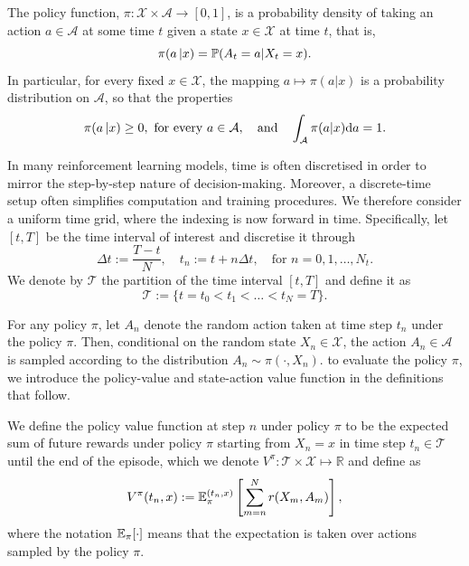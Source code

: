 \begin{definition}
\label{def: Stochastic policy function}
    The policy function, $\pi: \mathcal{X} \times \mathcal{A} \rightarrow [0,1]$, is a probability density of taking an action $a \in \mathcal{A}$ at some time $t$ given a state $x \in \mathcal{X}$ at time $t$, that is,
    \begin{equation*}
        \pi(a \, | x) = \mathbb{P}(A_t = a | X_t = x).
    \end{equation*}
    In particular, for every fixed $x \in \mathcal{X}$, the mapping $a \mapsto \pi(a | x) $ is a probability distribution on $\mathcal{A}$, so that the properties 
    \begin{equation*}
        \pi(a \, | x) \geq 0, \text{ for every } a \in \mathcal{A}, \quad \text{and} \quad \int_{\mathcal{A}} \pi(a | x) \mathrm{d} a = 1.
    \end{equation*}
\end{definition}

In many reinforcement learning models, time is often discretised in order to mirror the step-by-step nature of decision-making. Moreover, a discrete-time setup often simplifies computation and training procedures. We therefore consider a uniform time grid, where the indexing is now forward in time. Specifically, let $[t,T]$ be the time interval of interest and discretise it through
\begin{equation*}
    \Delta t := \frac{T-t}{N}, \quad t_n:= t+n \Delta t, \quad \text{for } n = 0,1,\ldots, N_t.
\end{equation*}
We denote by $\mathcal T$ the partition of the time interval $[t,T]$ and define it as
\begin{equation}
    \mathcal{T}:=\{t=t_0 < t_1 < \ldots < t_N = T\}. 
    \label{eqn: partition}
\end{equation}

For any policy $\pi$, let $A_n$ denote the random action taken at time step $t_n$ under the policy $\pi$. Then, conditional on the random state $X_n \in \mathcal X$, the action $A_n \in \mathcal A$ is sampled according to the distribution $A_n \sim \pi (\cdot, X_n)$. to evaluate the policy $\pi$, we introduce the policy-value and state-action value function in the definitions that follow.
\begin{definition}
\label{def: Policy-value function}
    We define the policy value function at step $n$ under policy $\pi$ to be the expected sum of future rewards under policy $\pi$ starting from $X_n = x$ in time step $t_n \in \mathcal T$ until the end of the episode, which we denote $V^\pi: \mathcal T \times \mathcal X \mapsto \mathbb R$ and define as
    \begin{equation*}
        V^\pi(t_n,x) := \mathbb{E}^{(t_n,x)}_\pi \left[\sum_{m=n}^N r(X_{m}, A_m)\right],
    \end{equation*}
    where the notation $\mathbb{E}_\pi[\cdot]$ means that the expectation is taken over actions sampled by the policy $\pi$. 
\end{definition}

